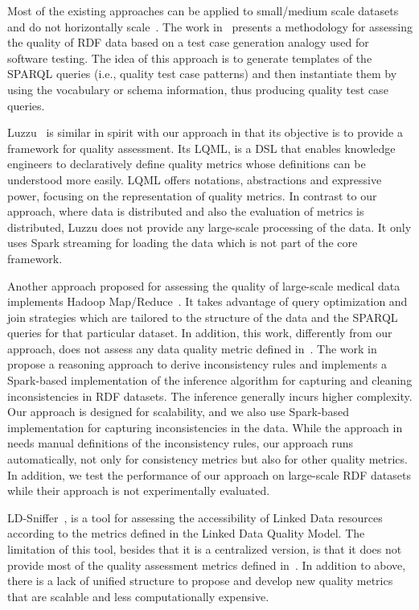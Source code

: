 Most of the existing approaches can be applied to small/medium scale datasets and do not horizontally scale~\cite{debattista2016luzzu,KontokostasWAHLCZ14}. 
The work in~\cite{KontokostasWAHLCZ14} presents a methodology for assessing the quality of \gls{RDF} data based on a test case generation analogy used for software testing. 
The idea of this approach is to generate templates of the \gls{SPARQL} queries (i.e., quality test case patterns) and then instantiate them by using the vocabulary or schema information, thus producing quality test case queries. 

Luzzu~\cite{debattista2016luzzu} is similar in spirit with our approach in that its objective is to provide a framework for quality assessment.
Its \gls{LQML}, is a \gls{DSL} that enables knowledge engineers to declaratively define quality metrics whose definitions can be understood more easily. 
\gls{LQML} offers notations, abstractions and expressive power, focusing on the representation of quality metrics.
In contrast to our approach, where data is distributed and also the evaluation of metrics is distributed, Luzzu does not provide any large-scale processing of the data. 
It only uses Spark streaming for loading the data which is not part of the core framework. 

Another approach proposed for assessing the quality of large-scale medical data implements Hadoop Map/Reduce~\cite{BonnerMKBTMCA15}. 
It takes advantage of query optimization and join strategies which are tailored to the structure of the data and the \gls{SPARQL} queries for that particular dataset. In addition, this work, differently from our approach, does not assess any data quality metric defined in~\cite{zaveri2015quality}.
The work in~\cite{BenbernouO17} propose a reasoning approach to derive inconsistency rules and implements a Spark-based implementation of the inference algorithm for capturing and cleaning inconsistencies in \gls{RDF} datasets. 
The inference generally incurs higher complexity. Our approach is designed for scalability, and we also use Spark-based implementation for capturing inconsistencies in the data.
While the approach in~\cite{BenbernouO17} needs manual definitions of the inconsistency rules, our approach runs automatically, not only for consistency metrics but also for other quality metrics. 
In addition, we test the performance of our approach on large-scale \gls{RDF} datasets while their approach is not experimentally evaluated. 

LD-Sniffer~\cite{Mihindukulasooriya2016LDSA}, is a tool for assessing the accessibility of Linked Data resources according to the metrics defined in the Linked Data Quality Model. 
The limitation of this tool, besides that it is a centralized version, is that it does not provide most of the quality assessment metrics defined in~\cite{zaveri2015quality}. 
In addition to above, there is a lack of unified structure to propose and develop new quality metrics that are scalable and less computationally expensive.

